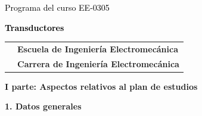\documentclass[letterpaper]{article}%
\begin{document}
%
\normalsize%
\thispagestyle{empty}%
%
\vspace*{100mm}%
\par\fontsize{14}{0}\selectfont \textcolor{black}{Programa del curso EE{-}0305}%
\par\fontsize{18}{25}\selectfont \textbf{\textcolor{black}{Transductores}}%
\vspace*{15mm}%
\newline%
\begin{tabularx}{\textwidth}{m{}m{}}%
&\hspace*{0mm}\fontsize{12}{0}\selectfont \textbf{\textcolor{gris}{Escuela de Ingeniería Electromecánica}}\\%
[-12pt]%
&\hspace*{0mm}\fontsize{12}{0}\selectfont \textbf{\textcolor{gris}{Carrera de Ingeniería Electromecánica}}\\%
\end{tabularx}%
\newpage%
\pagestyle{headfoot}%
\par\fontsize{14}{0}\selectfont \textbf{\textcolor{parte}{I parte: Aspectos relativos al plan de estudios}}%
\par\hspace*{2mm}\fontsize{12}{14}\selectfont \textbf{\textcolor{parte}{1. Datos generales}}%
\vspace*{3mm}%
\newline%
\fontsize{10}{12}\selectfont %
\end{document}
